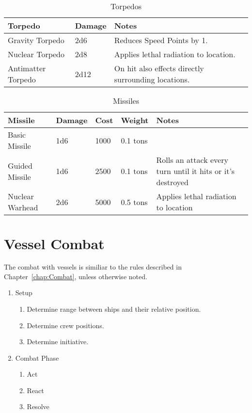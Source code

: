 \begin{table}
  \centering
  \caption{Torpedos}
  \begin{tabular}{|l|l|l|}
    \hline
    Torpedo            & Damage & Notes                                               \\ \hline
    Gravity Torpedo    & 2d6   & Reduces Speed Points by 1.                          \\ \hline
    Nuclear Torpedo    & 2d8   & Applies lethal radiation to location.               \\ \hline
    Antimatter Torpedo & 2d12   & On hit also effects directly surrounding locations. \\ \hline
  \end{tabular}
\end{table}

\begin{table}
  \centering
  \caption{Missiles}
  \begin{tabularx}{\textwidth}{|l|l|l|l|X|}
    \hline
    Missile         & Damage & Cost & Weight   & Notes                                                      \\ \hline
    Basic Missile   & 1d6    & 1000 & 0.1 tons & ~                                                          \\ \hline
    Guided Missile  & 1d6    & 2500 & 0.1 tons & Rolls an attack every turn until it hits or it's destroyed \\ \hline
    Nuclear Warhead & 2d6    & 5000 & 0.5 tons & Applies lethal radiation to location                       \\ \hline
  \end{tabularx}
\end{table}

\chapter{Vessel Combat}
\label{chap:Vessel Combat}

The combat with vessels is similiar to the rules described in Chapter~\ref{chap:Combat}, unless otherwise noted.

\begin{enumerate}
  \item Setup
  \begin{enumerate}
    \item Determine range between ships and their relative position.
    \item Determine crew positions.
    \item Determine initiative.
  \end{enumerate}
  \item Combat Phase
  \begin{enumerate}
    \item Act
    \item React
    \item Resolve
  \end{enumerate}
\end{enumerate}

